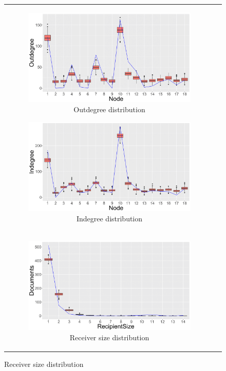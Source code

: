 \documentclass[ba]{imsart}
\numberwithin{equation}{section}
\theoremstyle{plain}
\begin{document}
	\begin{figure}[!t]
		\centering
		\begin{tabular}[t]{cc}
		   	\begin{subfigure}[b]{0.495\textwidth}
		   		\caption{Outdegree distribution}
		\includegraphics[width=\textwidth]{img/outdegree-1.png}	
		   	\end{subfigure}
		   			   	\begin{subfigure}[b]{0.495\textwidth}
		   			   		\caption{Indegree distribution}
		   			   		\includegraphics[width=\textwidth]{img/indegree-1.png}	
		   			   	\end{subfigure}\\
			   	\begin{subfigure}[b]{0.495\textwidth}
			   		\caption{Receiver size distribution}
			   		\includegraphics[width=\textwidth]{img/recipientsize-1.png}	

\end{subfigure}
\end{tabular}
\end{figure}
\end{document}
